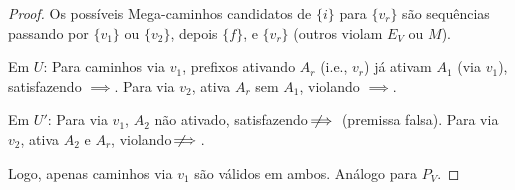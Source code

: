 \documentclass{article}
\begin{document}
\begin{proof}
Os possíveis Mega-caminhos candidatos de \( \{i\} \) para \( \{v_r\} \) são sequências passando por \( \{v_1\} \) ou \( \{v_2\} \), depois \( \{f\} \), e \( \{v_r\} \) (outros violam \( E_V \) ou \( M \)).

Em \( U \): Para caminhos via \( v_1 \), prefixos ativando \( A_r \) (i.e., \( v_r \)) já ativam \( A_1 \) (via \( v_1 \)), satisfazendo \( \implies \). Para via \( v_2 \), ativa \( A_r \) sem \( A_1 \), violando \( \implies \).

Em \( U' \): Para via \( v_1 \), \( A_2 \) não ativado, satisfazendo \( \not\!\!\!\implies \) (premissa falsa). Para via \( v_2 \), ativa \( A_2 \) e \( A_r \), violando \( \not\!\!\!\implies \).

Logo, apenas caminhos via \( v_1 \) são válidos em ambos. Análogo para \( P_V \).
\end{proof}

\newpage
\end{document}
